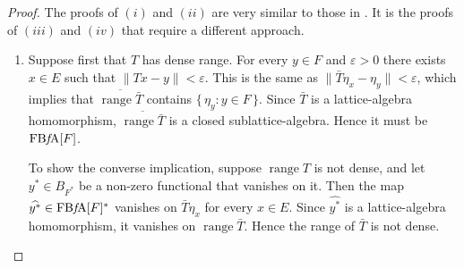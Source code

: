 \documentclass{memo-l}
\theoremstyle{definition}
\theoremstyle{remark}
\numberwithin{section}{chapter}
\numberwithin{equation}{chapter}
\newcommand{\FBFA}[1]{\operatorname{FB{\it f}\!A}[#1]}
\DeclareMathOperator{\range}{range}
\begin{document}
\begin{proof}
    The proofs of $(i)$ and $(ii)$ are very similar to those
    in
    \cite[Proposition 2.3]{oikhberg_etal2022}. It is the proofs of
    $(iii)$ and $(iv)$ that require a different approach.
    \begin{enumerate}
        \item  Suppose first that $T$ has
            dense range. For every $y \in F$ and $\varepsilon >0$
            there exists $x \in E$ such that $\|Tx-y\|<\varepsilon $.
            This is the same as $\|\bar{T}\eta _x-\eta 
            _y\|<\varepsilon $, which implies that $\overline{\range
            \bar{T}}$ contains $\{\, \eta _y : y\in F \, \} $. Since
            $\bar{T}$ is a lattice-algebra homomorphism,
            $\overline{\range \bar{T}}$ is a closed
            sublattice-algebra. Hence it must be $\FBFA F$.

            To show the converse implication, suppose $\range T$ is
            not dense, and let $y^{*}\in B_{F^{*}}$ be a non-zero
            functional that vanishes on it. Then the map
        $\widehat{y^{*}} \in \FBFA{F}^{*}$ vanishes on $\bar{T}\eta
            _x$ for every $x \in E$. Since $\widehat{y^{*}}$ is a
            lattice-algebra homomorphism, it vanishes on $\range
            \bar{T}$. Hence the range of $\bar{T}$ is not dense.


\end{enumerate}
\end{proof}
\end{document}
